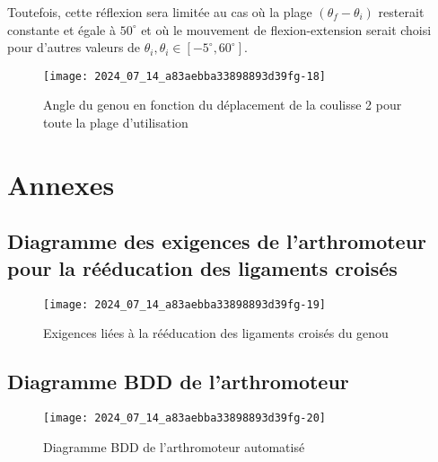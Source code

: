 Toutefois, cette réflexion sera limitée au cas où la plage $\left(\theta_{f}-\theta_{i}\right)$ resterait constante et égale à $50^{\circ}$ et où le mouvement de flexion-extension serait choisi pour d'autres valeurs de $\theta_{i}, \theta_{i} \in\left[-5^{\circ}, 60^{\circ}\right]$.




\begin{figure}[!h]\centering
\texttt{[image: 2024\_07\_14\_a83aebba33898893d39fg-18]}
\caption{\label{fig:ccs_mp_2024:fig:30}Angle du genou en fonction du déplacement de la coulisse 2 pour toute la plage d'utilisation}
\end{figure}
\section{Annexes}
\subsection{Diagramme des exigences de l'arthromoteur pour la rééducation des ligaments croisés}

\begin{figure}[!h]\centering
\texttt{[image: 2024\_07\_14\_a83aebba33898893d39fg-19]}
\caption{\label{fig:ccs_mp_2024:fig:31}Exigences liées à la rééducation des ligaments croisés du genou}
\end{figure}
\subsection{Diagramme BDD de l'arthromoteur}
\begin{figure}[!h]\centering
\texttt{[image: 2024\_07\_14\_a83aebba33898893d39fg-20]}
\caption{\label{fig:ccs_mp_2024:fig:32}Diagramme BDD de l'arthromoteur automatisé}
\end{figure}
